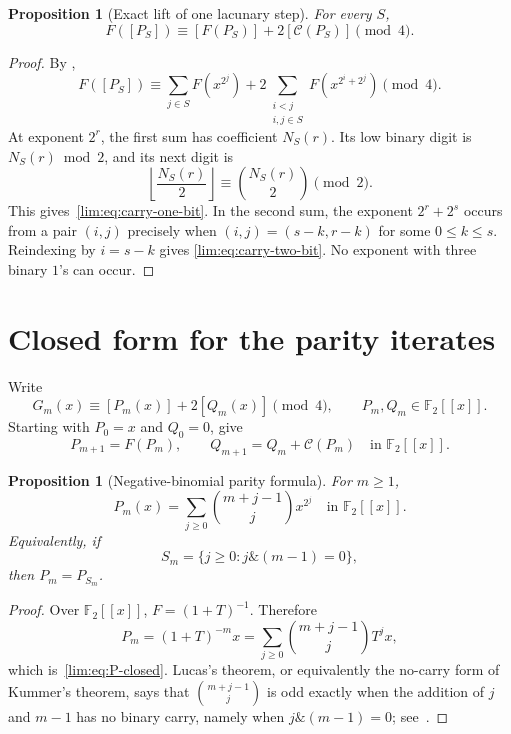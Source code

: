 \documentclass[11pt]{article}
\newtheorem{proposition}[theorem]{Proposition}
\theoremstyle{definition}
\theoremstyle{remark}
\newcommand{\Ftwo}{\mathbb F_2}
\newcommand{\band}{\mathbin{\&}}
\begin{document}
\begin{proposition}[Exact lift of one lacunary step]
\label{lim:prop:one-step-lift}
For every $S$,
\begin{equation}\label{lim:eq:one-step-lift}
  F([P_S])\equiv [F(P_S)]+2[\mathcal C(P_S)]\pmod4.
\end{equation}
\end{proposition}

\begin{proof}
By ,
\[
 F([P_S])\equiv
 \sum_{j\in S}F(x^{2^j})
 +2\sum_{\substack{i<j\\ i,j\in S}}F(x^{2^i+2^j})\pmod4.
\]
At exponent $2^r$, the first sum has coefficient $N_S(r)$.  Its low binary
digit is $N_S(r)\bmod2$, and its next digit is
\[
 \left\lfloor\frac{N_S(r)}2\right\rfloor
 \equiv\binom{N_S(r)}2\pmod2.
\]
This gives~\eqref{lim:eq:carry-one-bit}.  In the second sum, the exponent
$2^r+2^s$ occurs from a pair $(i,j)$ precisely when
$(i,j)=(s-k,r-k)$ for some $0\le k\le s$.  Reindexing by $i=s-k$ gives
\eqref{lim:eq:carry-two-bit}.  No exponent with three binary $1$'s can occur.
\end{proof}

\section{Closed form for the parity iterates}

Write
\begin{equation}\label{lim:eq:PQ-iterates}
  G_m(x)\equiv[P_m(x)]+2[Q_m(x)]\pmod4,
  \qquad P_m,Q_m\in\Ftwo[[x]].
\end{equation}
Starting with $P_0=x$ and $Q_0=0$, 
give
\begin{equation}\label{lim:eq:PQ-recurrence}
  P_{m+1}=F(P_m),
  \qquad
  Q_{m+1}=Q_m+\mathcal C(P_m)
  \quad\text{in }\Ftwo[[x]].
\end{equation}

\begin{proposition}[Negative-binomial parity formula]
\label{lim:prop:P-closed}
For $m\ge1$,
\begin{equation}\label{lim:eq:P-closed}
  P_m(x)=\sum_{j\ge0}\binom{m+j-1}{j}x^{2^j}
  \quad\text{in }\Ftwo[[x]].
\end{equation}
Equivalently, if
\[
  S_m=\{j\ge0:j\band(m-1)=0\},
\]
then $P_m=P_{S_m}$.
\end{proposition}

\begin{proof}
Over $\Ftwo[[x]]$, $F=(1+T)^{-1}$.  Therefore
\[
 P_m=(1+T)^{-m}x
 =\sum_{j\ge0}\binom{m+j-1}{j}T^jx,
\]
which is~\eqref{lim:eq:P-closed}.  Lucas's theorem, or equivalently the no-carry
form of Kummer's theorem, says that
$\binom{m+j-1}{j}$ is odd exactly when the addition of $j$ and $m-1$ has no
binary carry, namely when $j\band(m-1)=0$; see~\cite{Fine1947}.
\end{proof}
\end{document}
